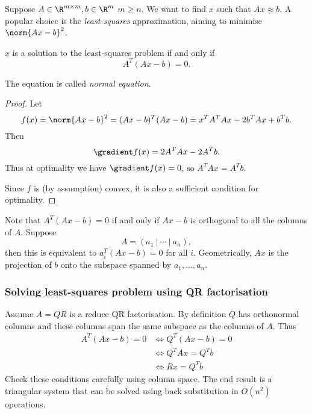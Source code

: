 \documentclass[a4paper]{article}
\begin{document}
Suppose \(A \in \R^{m \times m}, b \in \R^m\) \(m \geq n\). We want to find \(x\) such that \(Ax \approx b\). A popular choice is the \emph{least-squares} approximation, aiming to minimise \(\norm{Ax - b}^2\).

\begin{theorem}
  \(x\) is a solution to the least-squares problem if and only if
  \[
    A^T(Ax - b) = 0.
  \]
\end{theorem}

The equation is called \emph{normal equation}.

\begin{proof}
  Let
  \[
    f(x) = \norm{Ax - b}^2 = (Ax - b)^T(Ax - b) = x^TA^TAx - 2b^TAx + b^Tb.
  \]
  Then
  \[
    \gradient f(x) = 2A^TAx - 2A^Tb.
  \]
  Thus at optimality we have \(\gradient f(x) = 0\), so \(A^TAx = A^Tb\).

  Since \(f\) is (by assumption) convex, it is also a sufficient condition for optimality.
\end{proof}

Note that \(A^T(Ax - b) = 0\) if and only if \(Ax - b\) is orthogonal to all the columns of \(A\). Suppose
\[
  A = (a_1 \ | \ \cdots \ | \ a_n),
\]
then this is equivalent to \(a_i^T(Ax - b) = 0\) for all \(i\). Geometrically, \(Ax\) is the projection of \(b\) onto the subspace spanned by \(a_1, \dots, a_n\).

\subsubsection{Solving least-squares problem using QR factorisation}

Assume \(A = QR\) is a reduce QR factorisation. By definition \(Q\) has orthonormal columns and these columns span the same subspace as the columns of \(A\). Thus
\begin{align*}
  A^T(Ax - b) = 0
  &\Leftrightarrow Q^T(Ax - b) = 0 \\
  &\Leftrightarrow Q^TAx = Q^Tb \\
  &\Leftrightarrow Rx = Q^Tb
\end{align*}
Check these conditions carefully using column space. The end result is a triangular system that can be solved using back substitution in \(O(n^2)\) operations.

\printindex

\iffalse
http://damtp.cam.ac.uk/user/hf323/L18-IB-NA/
\fi
\end{document}
